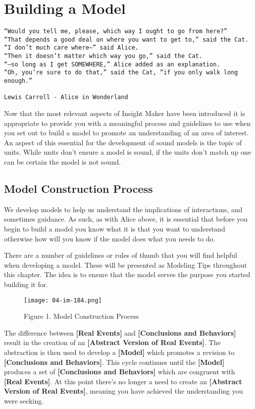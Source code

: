 \documentclass[]{memoir}
\let\Oldincludegraphics\includegraphics
\renewcommand{\includegraphics}[1]{\Oldincludegraphics[max size={\textwidth}{\textheight}]{#1}}
\newcommand{\p}[1]{\textbf{{[}#1{]}}}
\begin{document}
\chapter{Building a Model}

\begin{lstlisting}
“Would you tell me, please, which way I ought to go from here?”
“That depends a good deal on where you want to get to,” said the Cat.
“I don’t much care where–” said Alice.
“Then it doesn’t matter which way you go,” said the Cat.
“–so long as I get SOMEWHERE,” Alice added as an explanation.
“Oh, you’re sure to do that,” said the Cat, “if you only walk long enough.”

Lewis Carroll - Alice in Wonderland
\end{lstlisting}

Now that the most relevant aspects of Insight Maker have been introduced
it is appropriate to provide you with a meaningful process and
guidelines to use when you set out to build a model to promote an
understanding of an area of interest. An aspect of this essential for
the development of sound models is the topic of units. While units don't
ensure a model is sound, if the units don't match up one can be certain
the model is not sound.

\section{Model Construction Process}

We develop models to help us understand the implications of
interactions, and sometimes guidance. As such, as with Alice above, it
is essential that before you begin to build a model you know what it is
that you want to understand otherwise how will you know if the model
does what you needs to do.

There are a number of guidelines or rules of thumb that you will find
helpful when developing a model. These will be presented as Modeling
Tips throughout this chapter. The idea is to ensure that the model
serves the purpose you started building it for.

\begin{figure}[htbp]
\centering
\texttt{[image: 04-im-184.png]}
\caption{Figure 1. Model Construction Process}
\end{figure}

The difference between \p{Real Events} and \p{Conclusions and Behaviors}
result in the creation of an \p{Abstract Version of Real Events}. The
abstraction is then used to develop a \p{Model} which promotes a
revision to \p{Conclusions and Behaviors}. This cycle continues until
the \p{Model} produces a set of \p{Conclusions and Behaviors} which are
congruent with \p{Real Events}. At this point there's no longer a need
to create an \p{Abstract Version of Real Events}, meaning you have
achieved the understanding you were seeking.
\end{document}
